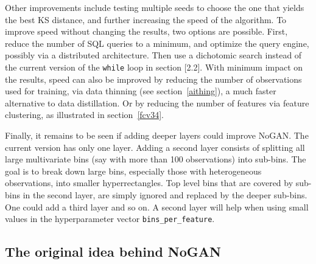 \documentclass[oneside,10pt]{book}
\begin{document}
 Other improvements include testing multiple seeds to choose the one that yields the best KS distance, and further increasing the speed of the algorithm. 
 To improve speed without changing the results, two options are possible. First, reduce the number of SQL queries to a minimum, and optimize the query engine, possibly via a
 distributed architecture. Then use a dichotomic search instead of the current version of the \texttt{while} loop in section [2.2]. 
With minimum impact on the results, speed can also be improved by reducing the number of observations used for training, via data thinning
 (see section~\ref{aithing}), a 
 much faster alternative to \textcolor{index}{data distillation}. Or by reducing the number of features via 
 \textcolor{index}{feature clustering}, as illustrated in section~\ref{fcv34}.  

Finally, it remains to be seen if adding deeper layers could improve NoGAN. The current version has only one layer. Adding a second layer consists
 of splitting all large multivariate bins (say with more than 100 observations) into sub-bins. The goal is to break down large bins, especially those
 with heterogeneous observations, into smaller hyperrectangles. Top level bins that are covered by sub-bins in the second layer, are simply ignored and replaced by the deeper
 sub-bins. One could add a third layer and so on. A second layer will help when using small values in
 the hyperparameter vector \texttt{bins\_per\_feature}.

\subsection{The original idea behind NoGAN}
\end{document}
